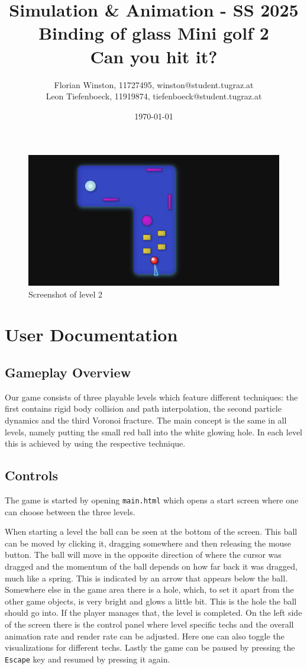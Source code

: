 \documentclass{article}
\title{	
	\large Simulation \& Animation - SS 2025\\
	\Huge{Binding of glass Mini golf 2}\\
	\huge{Can you hit it?}
}
\author{\parbox{\textwidth}{\centering
	Florian Winston, 11727495, winston@student.tugraz.at\\%
	Leon Tiefenboeck, 11919874, tiefenboeck@student.tugraz.at\\%
}}
\date{\today}
\begin{document}
\maketitle

\begin{figure}[H]
    \includegraphics[width=\textwidth]{showcase.png}
    \caption{Screenshot of level 2}
\end{figure}

\section{User Documentation}

\subsection{Gameplay Overview}

Our game consists of three playable levels which feature different techniques: the first contains rigid body collision and path interpolation, the second particle dynamics and the third Voronoi fracture. 
The main concept is the same in all levels, namely putting the small red ball into the white glowing hole. 
In each level this is achieved by using the respective technique.

\subsection{Controls}

The game is started by opening \texttt{main.html} which opens a 
start screen where one can choose between the three levels. 

When starting a level the ball can be seen at the bottom of the screen. This ball can be moved 
by clicking it, dragging somewhere and then releasing the mouse button. 
The ball will move in the opposite direction of where the cursor was dragged and the momentum of the 
ball depends on how far back it was dragged, much like a spring. This is indicated by an arrow that appears below the ball.
Somewhere else in the game area there is a hole, which, to set it apart from the other game objects, 
is very bright and glows a little bit. This is the hole 
the ball should go into. If the player manages that, the level is completed.
On the left side of the screen there is the control panel where level specific techs 
and the overall animation rate and render rate can be adjusted. Here one can also toggle the visualizations 
for different techs. 
Lastly the game can be paused by pressing the \texttt{Escape} key and resumed by pressing it again.
\end{document}
